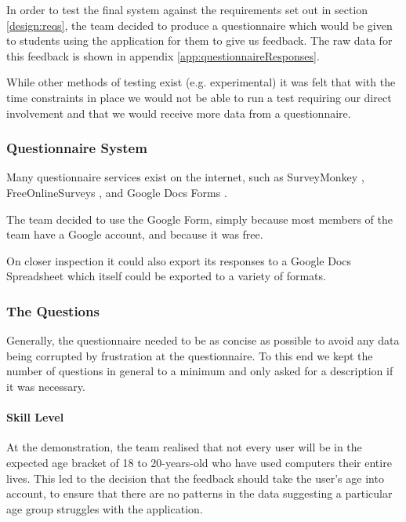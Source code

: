 In order to test the final system against the requirements set out in
section \ref{design:reqs}, the team decided to produce a
questionnaire which would be given to students using the application
for them to give us feedback.
The raw data for this feedback is shown in appendix
\ref{app:questionnaireResponses}.

While other methods of testing exist (e.g. experimental) it was felt
that with the time constraints in place we would not be able to run a
test requiring our direct involvement and that we would receive more
data from a questionnaire.

\subsubsection{Questionnaire System}

Many questionnaire services exist on the internet, such as
SurveyMonkey \cite{surveyMonkey}, FreeOnlineSurveys
\cite{freeOnlineSurveys}, and Google Docs Forms
\cite{googleDocsForms}.

The team decided to use the Google Form, simply because most members
of the team have a Google account, and because it was free.

On closer inspection it could also export its responses to a Google
Docs Spreadsheet which itself could be exported to a variety of
formats.

\subsubsection{The Questions}

Generally, the questionnaire needed to be as concise as possible to
avoid any data being corrupted by frustration at the questionnaire.
To this end we kept the number of questions in general to a minimum
and only asked for a description if it was necessary.

\paragraph{Skill Level}
At the demonstration, the team realised that not every user will be in
the expected age bracket of 18 to 20-years-old who have used computers
their entire lives.
This led to the decision that the feedback should take the user's age
into account, to ensure that there are no patterns in the data
suggesting a particular age group struggles with the application.

